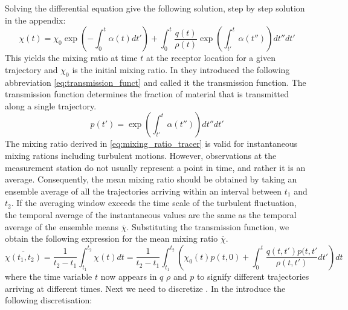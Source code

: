 Solving the differential equation give the following solution, step by step solution in the appendix:
\begin{equation}\label{eq:mixing_ratio_tracer}
    \chi(t) = \chi_0 \exp{\left(-\int_0^t \alpha(t)dt'\right)} + \int_0^t \frac{q(t)}{\rho(t)}\exp{\left(\int_{t'}^t\alpha(t'')\right)dt''}dt'
\end{equation}
This yields the mixing ratio at time $t$ at the receptor location for a given trajectory and $\chi_0$ is the initial mixing ratio. In \parencite{seibert2004source} they introduced the following abbreviation \cref{eq:transmission_funct} and called it the transmission function. The transmission function determines the fraction of material that is transmitted along a single trajectory.   
\begin{equation}\label{eq:transmission_funct}
    p(t') = \exp{\left(\int_{t'}^t\alpha(t'')\right)dt''}dt'
\end{equation} 
The mixing ratio derived in \cref{eq:mixing_ratio_tracer} is valid for instantaneous mixing rations including turbulent motions. However, observations at the measurement station do not usually represent a point in time, and rather it is an average. Consequently, the mean mixing ratio should be obtained by taking an ensemble average of all the trajectories arriving within an interval between $t_1$ and $t_2$. If the averaging window exceeds the time scale of the turbulent fluctuation, the temporal average of the instantaneous values are the same as the temporal average of the ensemble means $\overline{\chi}$. Substituting the transmission function, we obtain the following expression for the mean mixing ratio $\overline{\chi}$. 
\begin{equation}\label{eq:ensemble_mix_ratio}
    \overline{\chi(t_1, t_2)} = \frac{1}{t_2-t_1}\int_{t_1}^{t_2} \chi(t)dt = \frac{1}{t_2-t_1}\int_{t_1}^{t_2} \left(\chi_0(t)p(t,0)+\int_0^t \frac{q(t,t')p(t,t'}{\rho(t,t')}dt'\right)dt
\end{equation}
where the time variable $t$ now appears in $q$ $\rho$ and $p$ to signify different trajectories arriving at different times. Next we need to discretize . In \textcite{seibert2004source} the introduce the following discretisation:

